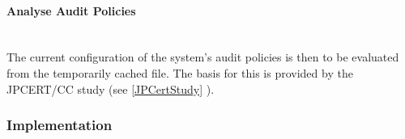 \paragraph{Analyse Audit Policies} \ \\
The current configuration of the system's audit policies is then to be evaluated from the temporarily cached file. The basis for this is provided by the JPCERT/CC study (see \ref{JPCertStudy} ).


\subsubsection{Implementation}



